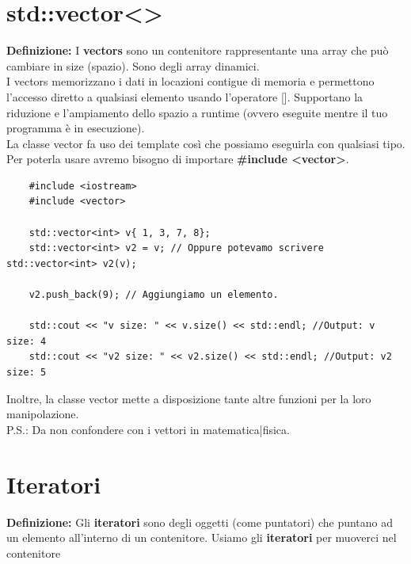 \section{std::vector<>}

\textsf{\small \textbf{Definizione:} I \textbf{vectors} sono un contenitore rappresentante una array che può cambiare in size (spazio). Sono degli array dinamici.} \\

\textsf{\small I vectors memorizzano i dati in locazioni contigue di memoria e permettono l'accesso diretto a qualsiasi elemento usando l'operatore []. Supportano la riduzione e l'ampiamento dello spazio a runtime (ovvero eseguite mentre il tuo programma è in esecuzione).} \\

\textsf{\small La classe vector fa uso dei template così che possiamo eseguirla con qualsiasi tipo. Per poterla usare avremo bisogno di importare \textbf{\#include <vector>}.} \\

\begin{lstlisting}
	#include <iostream>
	#include <vector>
	
	std::vector<int> v{ 1, 3, 7, 8};
	std::vector<int> v2 = v; // Oppure potevamo scrivere std::vector<int> v2(v);
	
	v2.push_back(9); // Aggiungiamo un elemento.
	
	std::cout << "v size: " << v.size() << std::endl; //Output: v size: 4
	std::cout << "v2 size: " << v2.size() << std::endl; //Output: v2 size: 5
\end{lstlisting}

\textsf{\small Inoltre, la classe vector mette a disposizione tante altre funzioni per la loro manipolazione.} \\

\textsf{\small P.S.: Da non confondere con i vettori in matematica|fisica.} \break


\newpage

\section{Iteratori}

\textsf{\small \textbf{Definizione: } Gli \textbf{iteratori} sono degli oggetti (come puntatori) che puntano ad un elemento all'interno di un contenitore. Usiamo gli \textbf{iteratori} per muoverci nel contenitore } \break

